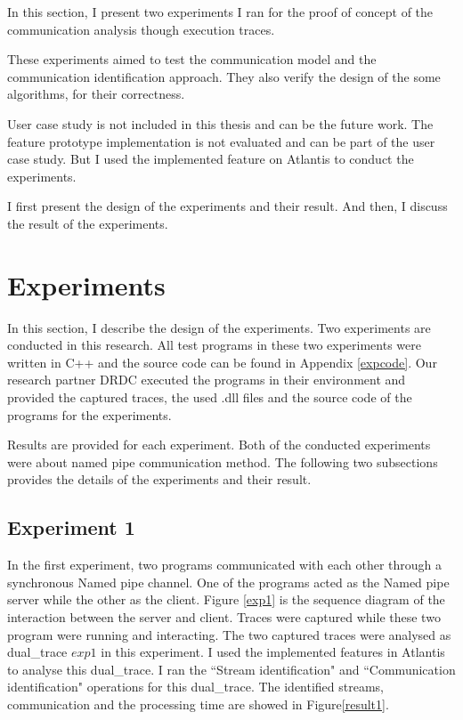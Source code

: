


\label{chapter:Exp}
In this section, I present two experiments I ran for the proof of concept of the communication analysis though execution traces.

These experiments aimed to test the communication model and the communication identification approach. They also verify the design of the some algorithms, for their correctness.  

User case study is not included in this thesis and can be the future work. The feature prototype implementation is not evaluated and can be part of the user case study. But I used the implemented feature on Atlantis to conduct the experiments.

I first present the design of the experiments and their result. And then, I discuss the result of the experiments.  

\section{Experiments}
In this section, I describe the design of the experiments. Two experiments are conducted in this research. All test programs in these two experiments were written in C++ and the source code can be found in Appendix \ref{expcode}. Our research partner DRDC executed the programs in their environment and provided the captured traces, the used .dll files and the source code of the programs for the experiments.

Results are provided for each experiment. Both of the conducted experiments were about named pipe communication method. The following two subsections provides the details of the experiments and their result.

\subsection{Experiment 1}
In the first experiment, two programs communicated with each other through a synchronous Named pipe channel. One of the programs acted as the Named pipe server while the other as the client. Figure \ref{exp1} is the sequence diagram of the interaction between the server and client. Traces were captured while these two program were running and interacting. The two captured traces were analysed as dual\_trace $exp1$ in this experiment. I used the implemented features in Atlantis to analyse this dual\_trace. I ran the ``Stream identification" and ``Communication identification" operations for this dual\_trace. The identified streams, communication and the processing time are showed in Figure\ref{result1}.

